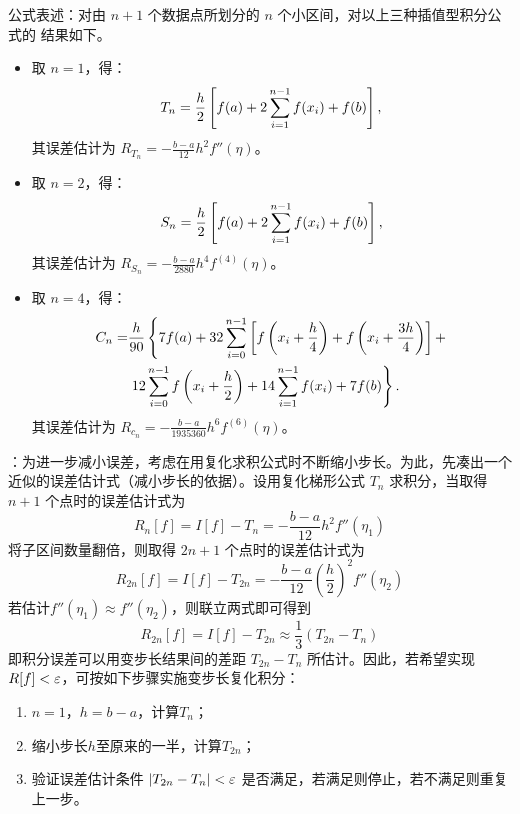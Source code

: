 \entry 公式表述：对由 $n+1$ 个数据点所划分的 $n$ 个小区间，对以上三种插值型积分公式的
结果如下。
\begin{itemize}
    \item 取 $n=1$，得：
    \begin{equation}
    T_n=\frac h2\left[f(a)+2\sum\limits_{i=1}^{n-1}f(x_i)+f(b)\right],
    \end{equation}
    其误差估计为 $R_{T_n}=-\frac{b-a}{12}h^2f''(\eta)$。
    \item 取 $n=2$，得：
    \begin{equation}
    S_n=\frac h2\left[f(a)+2\sum\limits_{i=1}^{n-1}f(x_i)+f(b)\right],
    \end{equation}
    其误差估计为 $R_{S_n}=-\frac{b-a}{2880}h^4f^{(4)}(\eta)$。
    \item 取 $n=4$，得：
    \begin{equation}\begin{aligned}
    C_n=&\frac h{90}\left\{7f(a)+32\sum\limits_{i=0}^{n-1}\left[
    f\left(x_i+\frac h4\right)+f\left(x_i+\frac{3h}4\right)\right]+\right.\\
    &\left.12\sum\limits_{i=0}^{n-1}f\left(x_i+\frac h2\right)+14\sum\limits_{i=1}^{n-1}f(x_i)
    +7f(b)\right\}.
    \end{aligned}\end{equation}
    其误差估计为 $R_{c_n}=-\frac{b-a}{1935360}h^6f^{(6)}(\eta)$。
\end{itemize}

\entry {}：为进一步减小误差，考虑在用复化求积公式时不断缩小步长。为此，先凑出一个近似的误差估计式（减小步长的依据）。设用复化梯形公式 $T_n$ 求积分，当取得 $n+1$ 个点时的误差估计式为
\begin{equation}
R_n[f]=I[f]-T_n=-\frac{b-a}{12}h^2f''(\eta_1)
\end{equation}
将子区间数量翻倍，则取得 $2n+1$ 个点时的误差估计式为
\begin{equation}
R_{2n}[f]=I[f]-T_{2n}=-\frac{b-a}{12}\left(\frac h2\right)^2f''(\eta_2)
\end{equation}
若估计$f''(\eta_1)\approx f''(\eta_2)$，则联立两式即可得到
\begin{equation}\label{6-e1}
R_{2n}[f]=I[f]-T_{2n}\approx\frac13(T_{2n}-T_n)
\end{equation}
即积分误差可以用变步长结果间的差距 $T_{2n}-T_n$ 所估计。因此，若希望实现 $R[f]<\varepsilon$，可按如下步骤实施变步长复化积分：
\begin{enumerate}\tl
    \item $n=1$，$h=b-a$，计算$T_n$；
    \item 缩小步长$h$至原来的一半，计算$T_{2n}$；
    \item 验证误差估计条件 $|T_{2n}-T_n|<\varepsilon$ 是否满足，若满足则停止，若不满足则重复上一步。
\end{enumerate}

